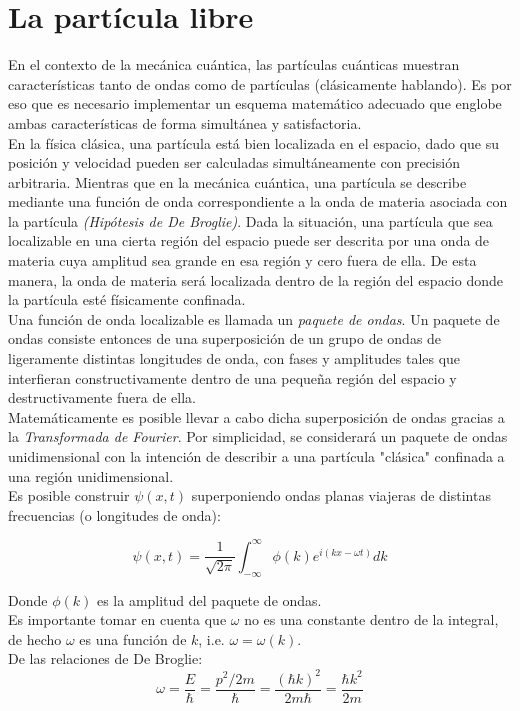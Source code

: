 \section{La partícula libre}
\label{La partícula libre}

En el contexto de la mecánica cuántica, las partículas cuánticas muestran características tanto de ondas como de 
partículas (clásicamente hablando). Es por eso que es necesario implementar un esquema matemático adecuado que englobe 
ambas características de forma simultánea y satisfactoria.\\
En la física clásica, una partícula está bien localizada en el espacio, dado que su posición y velocidad pueden ser 
calculadas simultáneamente con precisión arbitraria. Mientras que en la mecánica cuántica, una partícula se describe 
mediante una función de onda correspondiente a la onda de materia asociada con la partícula \emph{(Hipótesis de De Broglie)}. 
Dada la situación, una partícula que sea localizable en una cierta región del espacio puede ser descrita por una onda de materia 
cuya amplitud sea grande en esa región y cero fuera de ella. De esta manera, la onda de materia será localizada dentro 
de la región del espacio donde la partícula esté físicamente confinada.\\
Una función de onda localizable es llamada un \emph{paquete de ondas}. Un paquete de ondas consiste entonces de una 
superposición de un grupo de ondas de ligeramente distintas longitudes de onda, con fases y amplitudes tales que 
interfieran constructivamente dentro de una pequeña región del espacio y destructivamente fuera de ella.\\

Matemáticamente es posible llevar a cabo dicha superposición de ondas gracias a la \emph{Transformada de Fourier}. Por 
simplicidad, se considerará un paquete de ondas unidimensional con la intención de describir a una partícula "clásica" 
confinada a una región unidimensional.\\
Es posible construir $\psi(x,t)$ superponiendo ondas planas viajeras de distintas frecuencias (o longitudes de onda):

\begin{equation}
    \psi(x,t) = \frac{1}{\sqrt{2\pi}} \int_{-\infty}^{\infty} \phi(k)e^{i(kx-\omega t)}dk
\end{equation}

Donde $\phi(k)$ es la amplitud del paquete de ondas.\\
Es importante tomar en cuenta que $\omega$ no es una constante dentro de la integral, de hecho $\omega$ es una función de 
$k$, i.e. $\omega=\omega(k)$.\\
De las relaciones de De Broglie:
\begin{equation*}
    \omega = \frac{E}{\hbar} = \frac{p^2/2m}{\hbar} = \frac{(\hbar k)^2}{2m\hbar} = \frac{\hbar k^2}{2m}
\end{equation*}

